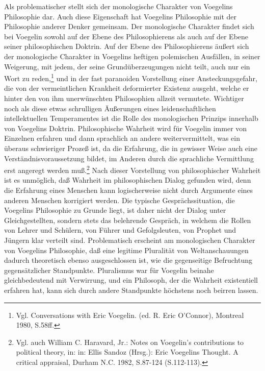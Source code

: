 Als problematischer stellt sich der monologische Charakter von Voegelins
Philosophie dar. Auch diese Eigenschaft hat Voegelins Philosophie mit
der Philosophie anderer Denker gemeinsam. Der monologische Charakter
findet sich bei Voegelin sowohl auf der Ebene des Philosophierens als
auch auf der Ebene seiner philosophischen Doktrin. Auf der Ebene des
Philosophierens äußert sich der monologische Charakter in Voegelins
heftigen polemischen Ausfällen, in seiner Weigerung, mit jedem, der
seine Grundüberzeugungen nicht teilt, auch nur ein Wort zu
reden,\footnote{Vgl. Conversations with Eric Voegelin. (ed. R.  Eric
  O'Connor), Montreal 1980, S.58ff.} und in der fast paranoiden
Vorstellung einer Ansteckungsgefahr, die von der vermeintlichen
Krankheit deformierter Existenz ausgeht, welche er hinter den von ihm
unerwünschten Philosophien allzeit vermutete. Wichtiger noch als diese
etwas schrulligen Äußerungen eines leidenschaftlichen intellektuellen
Temperamentes ist die Rolle des monologischen Prinzips innerhalb von
Voegelins Doktrin.  Philosophische Wahrheit wird für Voegelin immer von
Einzelnen erfahren und dann sprachlich an andere weitervermittelt, was
ein überaus schwieriger Prozeß ist, da die Erfahrung, die in gewisser
Weise auch eine Verständnisvoraussetzung bildet, im Anderen durch die
sprachliche Vermittlung erst angeregt werden muß.\footnote{Vgl. auch
  William C.  Haravard, Jr.: Notes on Voegelin's contributions to
  political theory, in: in: Ellis Sandoz (Hrsg.): Eric Voegelins
  Thought. A critical appraisal, Durham N.C. 1982, S.87-124
  (S.112-113).} Nach dieser Vorstellung von philosophischer Wahrheit ist
es unmöglich, daß Wahrheit im philosophischen Dialog gefunden wird, denn
die Erfahrung eines Menschen kann logischerweise nicht durch Argumente
eines anderen Menschen korrigiert werden. Die typische
Gesprächssituation, die Voegelins Philosophie zu Grunde liegt, ist daher
nicht der Dialog unter Gleichgestellten, sondern stets das belehrende
Gespräch, in welchem die Rollen von Lehrer und Schülern, von Führer und
Gefolgsleuten, von Prophet und Jüngern klar verteilt sind. Problematisch
erscheint am monologischen Charakter von Voegelins Philosophie, daß eine
legitime Pluralität von Weltanschauungen dadurch theoretisch ebenso
ausgeschlossen ist, wie die gegenseitige Befruchtung gegensätzlicher
Standpunkte. Pluralismus war für Voegelin beinahe gleichbedeutend mit
Verwirrung, und ein Philosoph, der die Wahrheit existentiell erfahren
hat, kann sich durch andere Standpunkte höchstens noch beirren lassen.

